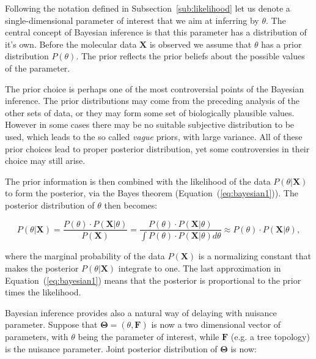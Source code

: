 Following the notation defined in Subsection~\ref{sub:likelihood}  let us denote a single-dimensional parameter of interest that we aim at inferring by $\theta$.
The central concept of Bayesian inference is that this parameter has a distribution of it's own.
Before the molecular data $\mathbf{X}$ is observed we assume that $\theta$ has a prior distribution $P(\theta)$.
The prior reflects the prior beliefs about the possible values of the parameter.

The prior choice is perhaps one of the most controversial points of the Bayesian inference.
The prior distributions may come from the preceding analysis of the other sets of data, or they may form some set of biologically plausible values.
However in some cases there may be no suitable subjective distribution to be used, which leads to the so called \emph{vague} priors, with large variance.
All of these prior choices lead to proper posterior distribution, yet some controversies in their choice may still arise.

The prior information is then combined with the likelihood of the data $P\left(\theta|\mathbf{X}\right)$ to form the posterior, via the Bayes theorem (Equation~(\ref{eq:bayesian1})).
The posterior distribution of $\theta$ then becomes:

\begin{equation}
P\left(\theta|\mathbf{X}\right)=\frac{P(\theta)\cdot P\left(\mathbf{X}|\theta\right)}{P\left(\mathbf{X}\right)}=\frac{P(\theta)\cdot P\left(\mathbf{X}|\theta\right)}{\int P(\theta)\cdot P\left(\mathbf{X}|\theta\right)d\theta}\approx P(\theta)\cdot P\left(\mathbf{X}|\theta\right),
\label{eq:bayesian1}
\end{equation}

\noindent
where the marginal probability of the data $P\left(\mathbf{X}\right)$ is a normalizing constant that makes the posterior $P\left(\theta|\mathbf{X}\right)$ integrate to one.
The last approximation in Equation~(\ref{eq:bayesian1}) means that the posterior is proportional to the prior times the likelihood.

Bayesian inference provides also a natural way of delaying with nuisance parameter.
Suppose that $\mathbf{\Theta}=\left(\theta,\mathbf{F}\right)$ is now a two dimensional vector of parameters, with $\theta$ being the parameter of interest, while 
$\mathbf{F}$ (e.g. a tree topology) is the nuisance parameter.
Joint posterior distribution of $\mathbf{\Theta}$ is now:


